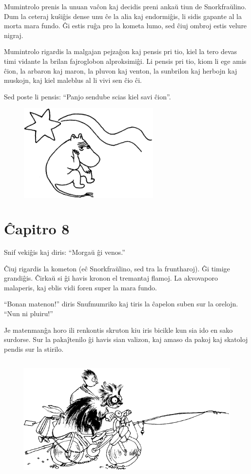 Mumintrolo prenis la unuan vaĉon kaj decidis preni ankaŭ tiun de Snorkfraŭlino. Dum la ceteraj kuŝiĝis dense unu ĉe la alia kaj endormiĝis, li sidis gapante al la morta mara fundo. Ĝi estis ruĝa pro la kometa lumo, sed ĉiuj ombroj estis velure nigraj.

Mumintrolo rigardis la malgajan pejzaĝon kaj pensis pri tio, kiel la tero devas timi vidante la brilan fajroglobon alproksimiĝi. Li pensis pri tio, kiom li ege amis ĉion, la arbaron kaj maron, la pluvon kaj venton, la sunbrilon kaj herbojn kaj muskojn, kaj kiel maleblus al li vivi sen ĉio ĉi.

Sed poste li pensis: ``Panjo sendube scias kiel savi ĉion''.

\begin{figure}[htbp]
\centering
\includegraphics[width=200pt,height=138pt]{7-9.png}
\caption{}
\label{7-9}
\end{figure}

\chapter*[Ĉapitro 8]{Ĉapitro 8}


Snif vekiĝis kaj diris: ``Morgaŭ ĝi venos.''

Ĉiuj rigardis la kometon (eĉ Snorkfraŭlino, sed tra la fruntharoj). Ĝi timige grandiĝis. Ĉirkaŭ si ĝi havis kronon el tremantaj flamoj. La akvovaporo malaperis, kaj eblis vidi foren super la mara fundo.

``Bonan matenon!'' diris Snufmumriko kaj tiris la ĉapelon suben sur la orelojn. ``Nun ni pluiru!''

Je matenmanĝa horo ili renkontis skruton kiu iris bicikle kun sia ido en sako surdorse. Sur la pakaĵtenilo ĝi havis sian valizon, kaj amaso da pakoj kaj skatoloj pendis sur la stirilo.

\begin{figure}[htbp]
\centering
\includegraphics[width=364pt,height=180pt]{8-1.png}
\caption{}
\label{8-1}
\end{figure}

